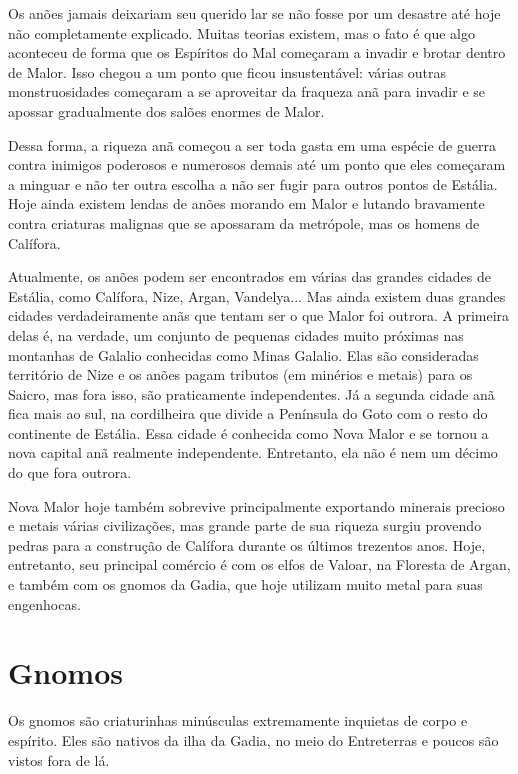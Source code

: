 \begin{multicols}{2}
Os anões jamais deixariam seu querido lar se não fosse por um desastre até hoje
não completamente explicado. Muitas teorias existem, mas o fato é que algo
aconteceu de forma que os Espíritos do Mal começaram a invadir e brotar dentro
de Malor. Isso chegou a um ponto que ficou insustentável: várias outras
monstruosidades começaram a se aproveitar da fraqueza anã para invadir e se
apossar gradualmente dos salões enormes de Malor.

Dessa forma, a riqueza anã começou a ser toda gasta em uma espécie de guerra
contra inimigos poderosos e numerosos demais até um ponto que eles começaram a
minguar e não ter outra escolha a não ser fugir para outros pontos de Estália.
Hoje ainda existem lendas de anões morando em Malor e lutando bravamente contra
criaturas malignas que se apossaram da metrópole, mas os homens de Calífora.

Atualmente, os anões podem ser encontrados em várias das grandes cidades de
Estália, como Calífora, Nize, Argan, Vandelya... Mas ainda existem duas grandes
cidades verdadeiramente anãs que tentam ser o que Malor foi outrora. A primeira
delas é, na verdade, um conjunto de pequenas cidades muito próximas nas
montanhas de Galalio conhecidas como Minas Galalio. Elas são consideradas
território de Nize e os anões pagam tributos (em minérios e metais) para os
Saicro, mas fora isso, são praticamente independentes. Já a segunda cidade anã
fica mais ao sul, na cordilheira que divide a Península do Goto com o resto do
continente de Estália. Essa cidade é conhecida como Nova Malor e se tornou a
nova capital anã realmente independente. Entretanto, ela não é nem um décimo do
que fora outrora.

Nova Malor hoje também sobrevive principalmente exportando minerais precioso e
metais várias civilizações, mas grande parte de sua riqueza surgiu provendo
pedras para a construção de Calífora durante os últimos trezentos anos. Hoje,
entretanto, seu principal comércio é com os elfos de Valoar, na Floresta de
Argan, e também com os gnomos da Gadia, que hoje utilizam muito metal para suas
engenhocas.

\section{Gnomos}%

Os gnomos são criaturinhas minúsculas extremamente inquietas de corpo e
espírito. Eles são nativos da ilha da Gadia, no meio do Entreterras e poucos são
vistos fora de lá.


\end{multicols}
